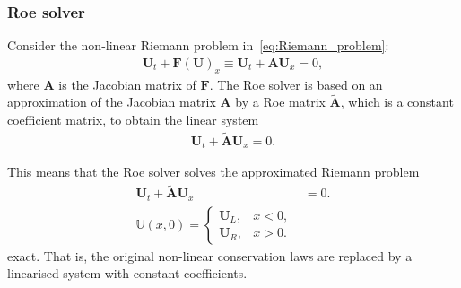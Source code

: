 \subsubsection{Roe solver}
Consider the non-linear Riemann problem in~\eqref{eq:Riemann_problem}:
\begin{align*}
    \mathbf{U}_t + \mathbf{F(U)}_x \equiv \mathbf{U}_t + \mathbf{A} \mathbf{U}_x = 0,
\end{align*}
where $\mathbf{A}$ is the Jacobian matrix of $\mathbf{F}$. 
The Roe solver is based on an approximation of the Jacobian matrix $\mathbf{A}$ by a Roe matrix $\tilde{\mathbf{A}}$, which is a constant coefficient matrix, to obtain the linear system
\begin{align*}
    \mathbf{U}_t + \mathbf{\tilde{A}} \mathbf{U}_x = 0.
\end{align*}

This means that the Roe solver solves the approximated Riemann problem
\begin{align*}
    \mathbf{U}_t + \mathbf{\tilde{A}} \mathbf{U}_x &= 0. \\
    \mathbb{U}(x,0) = \begin{cases}
        \mathbf{U}_L, & x < 0, \\
        \mathbf{U}_R, & x > 0.
    \end{cases}
\end{align*}
exact.
That is, the original non-linear conservation laws are replaced by a linearised system with constant coefficients.

